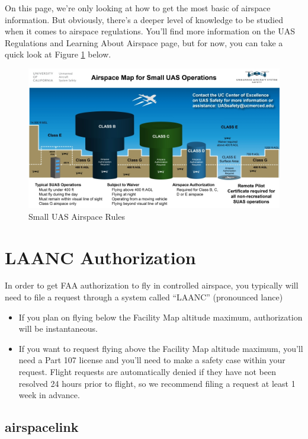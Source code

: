 \documentclass[
  12pt,
]{book}
\providecommand{\tightlist}{%
  \setlength{\itemsep}{0pt}\setlength{\parskip}{0pt}}
\begin{document}
On this page, we're only looking at how to get the most basic of airspace information. But obviously, there's a deeper level of knowledge to be studied when it comes to airspace regulations. You'll find more information on the UAS Regulations and Learning About Airspace page, but for now, you can take a quick look at Figure \ref{fig:SUAS-sim-regs} below.

\begin{figure}

{\centering \includegraphics[width=0.9\linewidth]{images/SUAS_airspace_map} 

}

\caption{Small UAS Airspace Rules}\label{fig:SUAS-sim-regs}
\end{figure}

\section{LAANC Authorization}\label{LAANC}

In order to get FAA authorization to fly in controlled airspace, you typically will need to file a request through a system called ``LAANC'' (pronounced lance)

\begin{itemize}
\tightlist
\item
  If you plan on flying below the Facility Map altitude maximum, authorization will be instantaneous.
\item
  If you want to request flying above the Facility Map altitude maximum, you'll need a Part 107 license and you'll need to make a safety case within your request. Flight requests are automatically denied if they have not been resolved 24 hours prior to flight, so we recommend filing a request at least 1 week in advance.
\end{itemize}

\subsection{airspacelink}\label{airspacelink}
\end{document}
